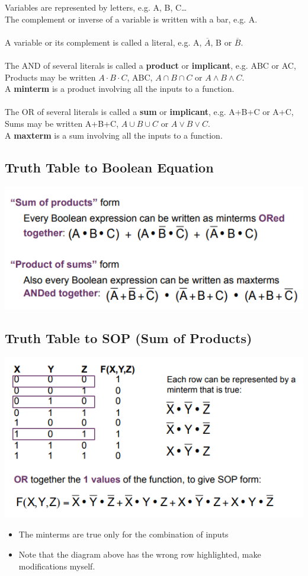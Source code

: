 \documentclass{article}[18pt]
\begin{document}
Variables are represented by letters, e.g. A, B, C…\\
The complement or inverse of a variable is written with a bar, e.g. A.\\
\\
A variable or its complement is called a literal, e.g. A, $\overline{A}$, B or $\overline{B}$.\\
\\
The AND of several literals is called a \textbf{product} or \textbf{implicant}, e.g. ABC or AC,\\
Products may be written $A\cdot B\cdot C$, ABC, $A\cap B\cap C$ or $A\land B\land C$.\\
A \textbf{minterm} is a product involving all the inputs to a function.\\
\\
The OR of several literals is called a \textbf{sum} or \textbf{implicant}, e.g. A+B+C or A+C,\\
Sums may be written A+B+C, $A\cup B\cup C$ or $A\lor B\lor C$.\\
A \textbf{maxterm} is a sum involving all the inputs to a function.
\subsection{Truth Table to Boolean Equation}
\includegraphics[scale=0.7]{TruthToBool.png}
\subsection{Truth Table to SOP (Sum of Products)}
\includegraphics[scale=0.7]{TruthToSOP.png}
\begin{itemize}
	\item The minterms are true only for the combination of inputs
	\item Note that the diagram above has the wrong row highlighted, make modifications myself.
\end{itemize}
\end{document}
